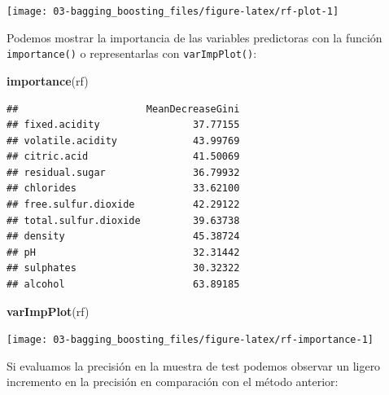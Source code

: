 \documentclass[
  spanish,
]{book}
\newenvironment{Shaded}{\begin{snugshade}}{\end{snugshade}}
\newcommand{\DataTypeTok}[1]{\textcolor[rgb]{0.13,0.29,0.53}{#1}}
\newcommand{\KeywordTok}[1]{\textcolor[rgb]{0.13,0.29,0.53}{\textbf{#1}}}
\newcommand{\NormalTok}[1]{#1}
\newcommand{\OperatorTok}[1]{\textcolor[rgb]{0.81,0.36,0.00}{\textbf{#1}}}
\newcommand{\StringTok}[1]{\textcolor[rgb]{0.31,0.60,0.02}{#1}}
\theoremstyle{break}
\theoremstyle{definition}
\theoremstyle{definition}
\theoremstyle{definition}
\theoremstyle{remark}
\begin{document}
\begin{center}\texttt{[image: 03-bagging\_boosting\_files/figure-latex/rf-plot-1]} \end{center}

Podemos mostrar la importancia de las variables predictoras con la función \texttt{importance()} o representarlas con \texttt{varImpPlot()}:

\begin{Shaded}
\begin{Highlighting}[]
\KeywordTok{importance}\NormalTok{(rf)}
\end{Highlighting}
\end{Shaded}

\begin{verbatim}
##                      MeanDecreaseGini
## fixed.acidity                37.77155
## volatile.acidity             43.99769
## citric.acid                  41.50069
## residual.sugar               36.79932
## chlorides                    33.62100
## free.sulfur.dioxide          42.29122
## total.sulfur.dioxide         39.63738
## density                      45.38724
## pH                           32.31442
## sulphates                    30.32322
## alcohol                      63.89185
\end{verbatim}

\begin{Shaded}
\begin{Highlighting}[]
\KeywordTok{varImpPlot}\NormalTok{(rf)}
\end{Highlighting}
\end{Shaded}

\begin{center}\texttt{[image: 03-bagging\_boosting\_files/figure-latex/rf-importance-1]} \end{center}

Si evaluamos la precisión en la muestra de test podemos observar un ligero incremento en la precisión en comparación con el método anterior:

\begin{Shaded}
\end{Shaded}
\end{document}
